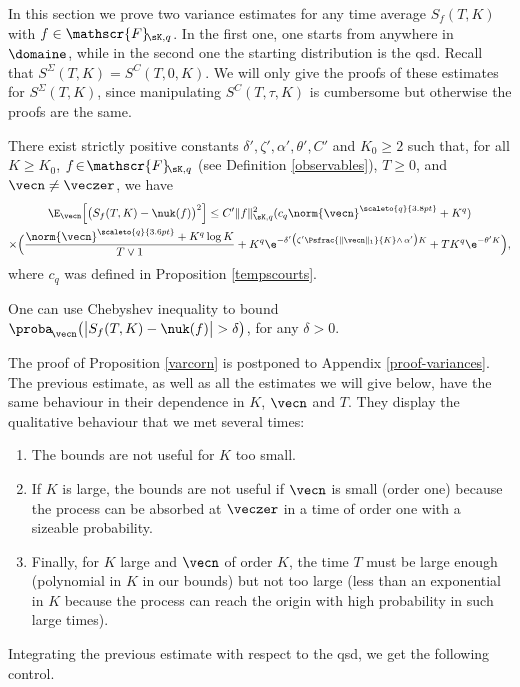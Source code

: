 In this section we prove two variance estimates for any time average $S_{f}(T,K)$ with $f\in \mathscr{F}\!_{\sK,q}$.
In the first one, one starts from anywhere in $\domaine$, while in the second one the starting distribution is the qsd.
Recall that $S^{{ \Sigma}}(T,K)=S^{C}(T,0,K)$. We will only give the proofs of these
estimates for $S^{{ \Sigma}}(T,K)$, since manipulating $S^{C}(T,\tau,K)$ is cumbersome but
otherwise the proofs are the same.

\begin{proposition}\label{varcorn}
There exist strictly positive constants $\delta', \zeta', \alpha', \theta', C'$ and $K_0\geq 2$ such that, for all $K\geq K_0$,
$f\!\in\!\mathscr{F}\!_{\sK,q}$ (see Definition \ref{observables}), $T\geq 0$, and $\vecn\neq \veczer$, we have%
\begin{multline*}
\E_{\vecn}\Bigl[\bigl(S_{f}(T,K)-\nuk(f)\bigr)^2\Bigr]
\leq C' \|f\|_{\sK,q}^2(c_q\norm{\vecn}^{\scaleto{q}{3.8pt}} +K^q)\\
\times
\Bigl(
\frac{\norm{\vecn}^{\scaleto{q}{3.6pt}} +K^q \log K}{T\vee 1}+
K^q \e^{-\delta'\bigl(\zeta' \Psfrac{\|\vecn\|_{1}}{K}\wedge \,\alpha'\bigr)K}+ T K^q \e^{-\theta' K}
\Bigr),
\end{multline*}
where $c_q$ was defined in Proposition \ref{tempscourts}.
\end{proposition}

One can use Chebyshev inequality to bound $\proba_{\!\vecn}\bigl(\big|S_{f}(T,K)-\nuk(f)\big|>\delta\bigr)$,
for any $\delta>0$.

The proof of Proposition \ref{varcorn} is postponed to Appendix \ref{proof-variances}.
The previous estimate, as well as all the estimates we will give below, have the same behaviour in their dependence in $K$, $\vecn$ and
$T$. They display the qualitative behaviour that we met several times:
\begin{enumerate}
\item The bounds are not useful for $K$ too small.
\item If $K$ is large, the bounds are not useful if $\vecn$ is small (order one) because the process can be absorbed at
$\veczer$ in a time of order one with a sizeable probability.
\item Finally, for $K$ large and $\vecn$ of order $K$, the time $T$ must be large enough (polynomial in $K$ in
our bounds) but not too large (less than an exponential in $K$ because the process can reach the origin with high probability in
such large times).
\end{enumerate}
Integrating the previous estimate with respect to the qsd, we get the following control.

